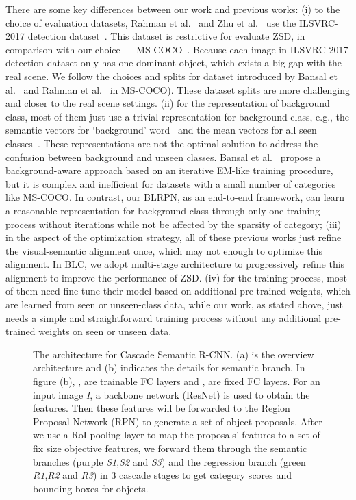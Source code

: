 \documentclass[runningheads]{llncs}
\begin{document}
There are some key differences between our work and previous works: (i) to the choice of evaluation datasets, Rahman et al.~\cite{rahman2018zero} and Zhu et al.~\cite{zhu2019zero} use the ILSVRC-2017 detection dataset~\cite{russakovsky2015imagenet}. This dataset is restrictive for evaluate ZSD, in comparison with our choice --- MS-COCO~\cite{lin2014microsoft}. Because each image in ILSVRC-2017 detection dataset only has one dominant object, which exists a big gap with the real scene. We follow the choices and splits for dataset introduced by Bansal et al.~\cite{bansal2018zero} and Rahman et al.~\cite{rahman2020improved} in MS-COCO). These dataset splits are more challenging and closer to the real scene settings. (ii) for the representation of background class, most of them just use a trivial representation for background class, e.g., the semantic vectors for ‘background’ word~\cite{bansal2018zero} and the mean vectors for all seen classes~\cite{rahman2018zero}. These representations are not the optimal solution to address the confusion between background and unseen classes. Bansal et al.~\cite{bansal2018zero} propose a background-aware approach based on an iterative EM-like training procedure, but it is complex and inefficient for datasets with a small number of categories like MS-COCO. In contrast, our BLRPN, as an end-to-end framework, can learn a reasonable representation for background class through only one training process without iterations while not be affected by the sparsity of category; (iii) in the aspect of the optimization strategy, all of these previous works just refine the visual-semantic alignment once, which may not enough to optimize this alignment. In BLC, we adopt multi-stage architecture to progressively refine this alignment to improve the performance of ZSD. (iv) for the training process, most of them need fine tune their model based on additional pre-trained weights, which are learned from seen or unseen-class data, while our work, as stated above, just needs a simple and straightforward training process without any additional pre-trained weights on seen or unseen data.
\begin{figure}[tbp]
\centering
{}
\caption{The architecture for Cascade Semantic R-CNN. (a) is the overview architecture and (b) indicates the details for semantic branch. In figure (b), {\it }, {\it } are trainable FC layers and {\it }, {\it } are fixed FC layers. For an input image {\it I}, a backbone network (ResNet) is used to obtain the features. Then these features will be forwarded to the Region Proposal Network (RPN) to generate a set of object proposals. After we use a RoI pooling layer to map the proposals' features to a set of fix size objective features, we forward them through the semantic branches (purple {\it {S1}},{\it {S2}} and {\it {S3}}) and the regression branch (green {\it {R1}},{\it {R2}} and {\it {R3}}) in 3 cascade stages to get category scores and bounding boxes for objects.}
\label{fig:figure1}
\end{figure}
\end{document}
